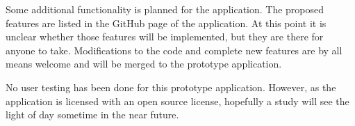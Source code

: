 Some additional functionality is planned for the application. The proposed features are listed in the GitHub page of the application. At this point it is unclear whether those features will be implemented, but they are there for anyone to take. Modifications to the code and complete new features are by all means welcome and will be merged to the prototype application.

No user testing has been done for this prototype application. However, as the application is licensed with an open source license, hopefully a study will see the light of day sometime in the near future.

